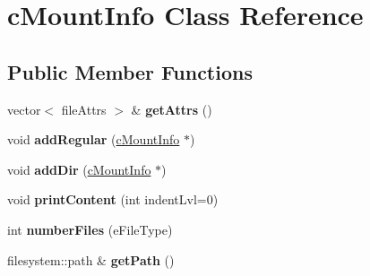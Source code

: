 \hypertarget{classcMountInfo}{\section{c\-Mount\-Info \-Class \-Reference}
\label{d7/d18/classcMountInfo}
}
\subsection*{\-Public \-Member \-Functions}
\begin{DoxyCompactItemize}
\item 
\hypertarget{classcMountInfo_ad41825c13091e499df3606f36477ce8d}{vector$<$ file\-Attrs $>$ \& {\bfseries get\-Attrs} ()}\label{d7/d18/classcMountInfo_ad41825c13091e499df3606f36477ce8d}

\item 
\hypertarget{classcMountInfo_a60c0c7efcc06de43aee97c098f7ca79e}{void {\bfseries add\-Regular} (\hyperlink{classcMountInfo}{c\-Mount\-Info} $\ast$)}\label{d7/d18/classcMountInfo_a60c0c7efcc06de43aee97c098f7ca79e}

\item 
\hypertarget{classcMountInfo_a504cafc1098657ecbd2f3523d02297c8}{void {\bfseries add\-Dir} (\hyperlink{classcMountInfo}{c\-Mount\-Info} $\ast$)}\label{d7/d18/classcMountInfo_a504cafc1098657ecbd2f3523d02297c8}

\item 
\hypertarget{classcMountInfo_a456f1229fe86b8815f738bd174e4409a}{void {\bfseries print\-Content} (int indent\-Lvl=0)}\label{d7/d18/classcMountInfo_a456f1229fe86b8815f738bd174e4409a}

\item 
\hypertarget{classcMountInfo_a922916b79833982f1196cdd9709e5970}{int {\bfseries number\-Files} (e\-File\-Type)}\label{d7/d18/classcMountInfo_a922916b79833982f1196cdd9709e5970}

\item 
\hypertarget{classcMountInfo_a57176c82a28af7af249c1d5913387dc7}{filesystem\-::path \& {\bfseries get\-Path} ()}\label{d7/d18/classcMountInfo_a57176c82a28af7af249c1d5913387dc7}

\end{DoxyCompactItemize}
